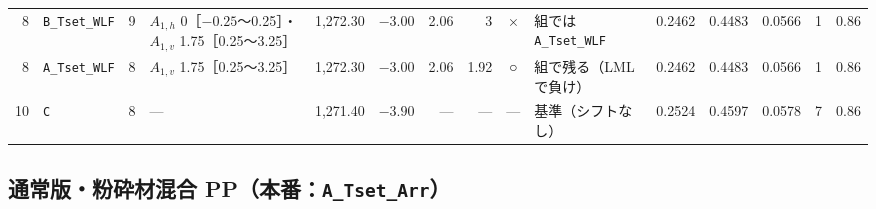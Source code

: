 \documentclass[paper=a4paper,landscape,fontsize=10pt,line_length=62zw,number_of_lines=34]{jlreq}
\begin{document}
\begin{table}[H]
\begin{tabular}{rlrp{12\zw}rrrrcp{8.5\zw}rrrrr}
8 & \texttt{B\_\allowbreak{}Tset\_\allowbreak{}WLF} & 9 & $A_{1,h}$ 0［$-0.25$〜0.25］・$A_{1,v}$ 1.75［0.25〜3.25］ & 1,272.30 & $-3.00$ & 2.06 & 3 & × & 組では \texttt{A\_\allowbreak{}Tset\_\allowbreak{}WLF} & 0.2462 & 0.4483 & 0.0566 & 1 & 0.86 \\
8 & \texttt{A\_\allowbreak{}Tset\_\allowbreak{}WLF} & 8 & $A_{1,v}$ 1.75［0.25〜3.25］ & 1,272.30 & $-3.00$ & 2.06 & 1.92 & ○ & 組で残る（LML で負け） & 0.2462 & 0.4483 & 0.0566 & 1 & 0.86 \\
10 & \texttt{C} & 8 & --- & 1,271.40 & $-3.90$ & --- & --- & --- & 基準（シフトなし） & 0.2524 & 0.4597 & 0.0578 & 7 & 0.86 \\
\bottomrule
\end{tabular}
\end{table}

\subsection{通常版・粉砕材混合 PP（本番：\texttt{A\_\allowbreak{}Tset\_\allowbreak{}Arr}）}
\end{document}
